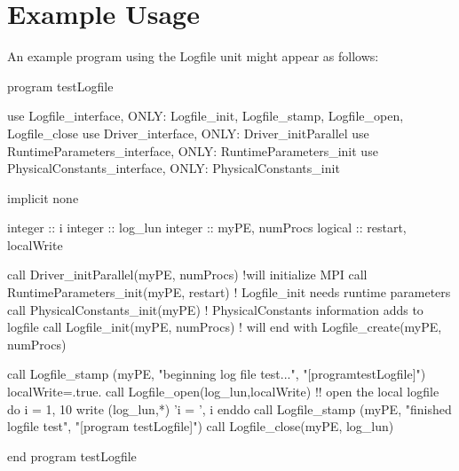 \section{Example Usage}

An example program using the Logfile unit might appear as follows:

\begin{codeseg}
program testLogfile

    use Logfile_interface, ONLY: Logfile_init, Logfile_stamp, Logfile_open, Logfile_close
    use Driver_interface, ONLY: Driver_initParallel
    use RuntimeParameters_interface, ONLY: RuntimeParameters_init
    use PhysicalConstants_interface, ONLY: PhysicalConstants_init

    implicit none

    integer :: i
    integer :: log_lun 
    integer :: myPE, numProcs
    logical :: restart, localWrite

    call Driver_initParallel(myPE, numProcs) !will initialize MPI
    call RuntimeParameters_init(myPE, restart) ! Logfile_init needs runtime parameters
    call PhysicalConstants_init(myPE) ! PhysicalConstants information adds to logfile
    call Logfile_init(myPE, numProcs) ! will end with Logfile_create(myPE, numProcs)

    call Logfile_stamp (myPE, "beginning log file test...", "[programtestLogfile]")
    localWrite=.true.
    call Logfile_open(log_lun,localWrite) !! open the local logfile
    do i = 1, 10
      write (log_lun,*) 'i = ', i
    enddo
    call Logfile_stamp (myPE, "finished logfile test", "[program testLogfile]")
    call Logfile_close(myPE, log_lun)
  

end program testLogfile
\end{codeseg}

